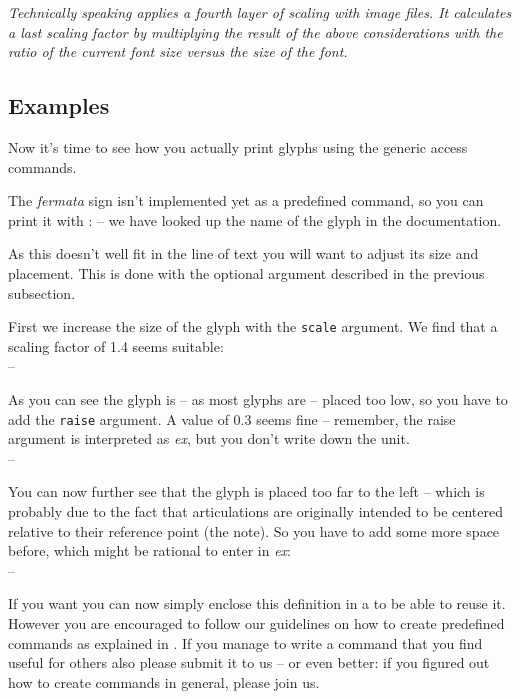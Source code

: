 \documentclass{article}
\begin{document}
\textit{Technically speaking \lilyglyphs{} applies a fourth layer of scaling with image files.
It calculates a last scaling factor by multiplying the result of the above considerations with the ratio of the current font size versus the size of the  font.}


\subsection{Examples}
\label{subsec:examples}
Now it's time to see how you actually print \emmentaler glyphs using the generic access commands.

The \emph{fermata} sign isn't implemented yet as a predefined command, so you can print it with :  -- we have looked up the name of the glyph in the documentation.
 
As this doesn't well fit in the line of text you will want to adjust its size and placement.
This is done with the optional argument described in the previous subsection.

First we increase the size of the glyph with the \texttt{scale} argument. We find that a scaling factor of 1.4 seems suitable:\\
 -- 

As you can see the glyph is -- as most \emmentaler glyphs are -- placed too low, so you have to add the \texttt{raise} argument. A value of 0.3 seems fine -- remember, the raise argument is interpreted as \emph{ex}, but you don't write down the unit.\\
  -- 
 
You can now further see that the glyph is placed too far to the left -- which is probably due to the fact that articulations are originally intended to be centered relative to their reference point (the note).
So you have to add some more space before, which might be rational to enter in \emph{ex}:\\
 -- \hspace{1ex}

\medskip
If you want you can now simply enclose this definition in a   to be able to reuse it.
However you are encouraged to follow our guidelines on how to create predefined commands as explained in .
If you manage to write a command that you find useful for others also please submit it to us -- or even better: if you figured out how to create commands in general, please join us.
\end{document}
